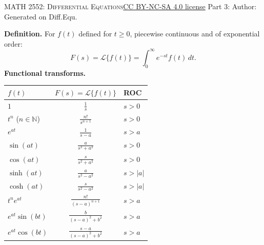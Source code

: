 \newpage\handout
{\textsc{MATH 2552: Differential Equations}}{\href{https://creativecommons.org/licenses/by-nc-sa/4.0/}{CC BY-NC-SA 4.0 license}}
{Part 3: }
{Author: \href{\HandoutAuthorUrl}{\HandoutAuthor}}{Generated on \generatedOn}
{Diff.Equ.}

\newpage




\textbf{Definition.} For $f(t)$ defined for $t \ge 0$, piecewise continuous and of exponential order:
$$
F(s) = \mathcal{L}\{f(t)\} = \int_{0}^{\infty} e^{-st} f(t) \, dt.
$$
\textbf{Functional transforms.}
\renewcommand{\arraystretch}{1.8}%
\begin{center}
\begin{tabularx}{\textwidth}{|X|c|X|}
  \hline
  \textbf{$f(t)$} & \textbf{$F(s)=\mathcal{L}\{f(t)\}$} & \textbf{ROC} \\
  \hline
  $\displaystyle 1$ & $\displaystyle \frac{1}{s}$ & $\displaystyle s > 0$ \\
  $\displaystyle t^n$ ($n \in \mathbb{N}$) & $\displaystyle \frac{n!}{s^{n+1}}$ & $\displaystyle s > 0$ \\
  $\displaystyle e^{at}$ & $\displaystyle \frac{1}{s-a}$ & $\displaystyle s > a$ \\
  $\displaystyle \sin(at)$ & $\displaystyle \frac{a}{s^2 + a^2}$ & $\displaystyle s > 0$ \\
  $\displaystyle \cos(at)$ & $\displaystyle \frac{s}{s^2 + a^2}$ & $\displaystyle s > 0$ \\
  $\displaystyle \sinh(at)$ & $\displaystyle \frac{a}{s^2 - a^2}$ & $\displaystyle s > |a|$ \\
  $\displaystyle \cosh(at)$ & $\displaystyle \frac{s}{s^2 - a^2}$ & $\displaystyle s > |a|$ \\
  $\displaystyle t^n e^{at}$ & $\displaystyle \frac{n!}{(s-a)^{n+1}}$ & $\displaystyle s > a$ \\
  $\displaystyle e^{at} \sin(bt)$ & $\displaystyle \frac{b}{(s-a)^2 + b^2}$ & $\displaystyle s > a$ \\
  $\displaystyle e^{at} \cos(bt)$ & $\displaystyle \frac{s-a}{(s-a)^2 + b^2}$ & $\displaystyle s > a$ \\
  \hline
\end{tabularx}
\end{center}

